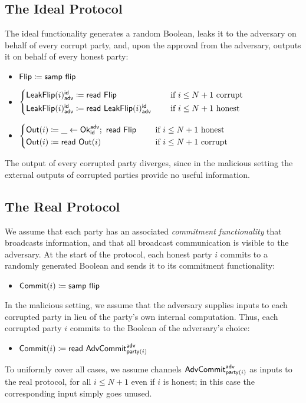 \subsection{The Ideal Protocol}
The ideal functionality generates a random Boolean, leaks it to the adversary on behalf of every corrupt party, and, upon the approval from the adversary, outputs it on behalf of every honest party:
\begin{itemize}
\item $\mathsf{Flip} \coloneqq \mathsf{samp} \ \mathsf{flip}$
\item $\begin{cases*} \LeakFlip(i)^\id_\adv \coloneqq \read{\Flip} & \hspace{10pt} \text{if $i \leq N+1$ corrupt} \\ \LeakFlip(i)^\id_\adv \coloneqq \read{\LeakFlip(i)^\id_\adv} & \hspace{10pt} \text{if $i \leq N+1$ honest} \end{cases*}$
 \item $\begin{cases*} \Out(i) \coloneqq \_ \leftarrow \Ok^\adv_\id; \ \read{\Flip} & \hspace{10pt} \text{if $i \leq N+1$ honest} \\ \Out(i) \coloneqq \read{\Out(i)} & \hspace{10pt} \text{if $i \leq N+1$ corrupt} \end{cases*}$
\end{itemize}
The output of every corrupted party diverges, since in the malicious setting the external outputs of corrupted parties provide no useful information.

\subsection{The Real Protocol}
We assume that each party has an associated \emph{commitment functionality} that broadcasts information, and that all broadcast communication is visible to the adversary. At the start of the protocol, each honest party $i$ commits to a randomly generated Boolean and sends it to its commitment functionality:
\begin{itemize}
\item {\color{blue} $\mathsf{Commit}(i) \coloneqq \mathsf{samp} \ \mathsf{flip}$}
\end{itemize}
In the malicious setting, we assume that the adversary supplies inputs to each corrupted party in lieu of the party's own internal computation. Thus, each corrupted party $i$ commits to the Boolean of the adversary's choice:
\begin{itemize}
\item {\color{blue} $\mathsf{Commit}(i) \coloneqq \mathsf{read} \ \mathsf{AdvCommit}^{\mathsf{adv}}_{\mathsf{party}(i)}$}
\end{itemize}
To uniformly cover all cases, we assume channels $\mathsf{AdvCommit}^{\mathsf{adv}}_{\mathsf{party}(i)}$ as inputs to the real protocol, for all $i \leq N+1$ even if $i$ is honest; in this case the corresponding input simply goes unused.


